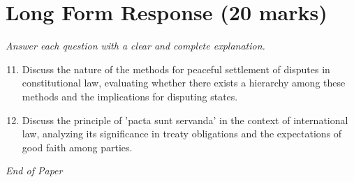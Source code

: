 \documentclass[12pt]{article}
\begin{document}
\section*{Long Form Response (20 marks)}
\textit{Answer each question with a clear and complete explanation.}
\begin{enumerate}[label=\arabic*.]
\setcounter{enumi}{10}
\item Discuss the nature of the methods for peaceful settlement of disputes in constitutional law, evaluating whether there exists a hierarchy among these methods and the implications for disputing states.
\item Discuss the principle of 'pacta sunt servanda' in the context of international law, analyzing its significance in treaty obligations and the expectations of good faith among parties.
\end{enumerate}

\vfill
\noindent\textit{End of Paper}
\end{document}
